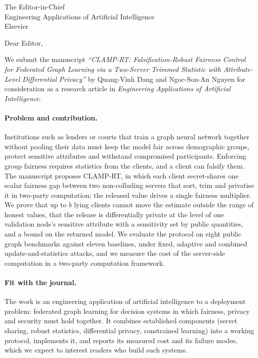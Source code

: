 \documentclass[11pt]{letter}
\date{\today}
\begin{document}
\begin{letter}{The Editor-in-Chief\\Engineering Applications of Artificial Intelligence\\Elsevier}

\opening{Dear Editor,}

We submit the manuscript \emph{``CLAMP-RT: Falsification-Robust Fairness Control for Federated Graph Learning via a Two-Server Trimmed Statistic with Attribute-Level Differential Privacy''} by Quang-Vinh Dang and Ngoc-Son-An Nguyen for consideration as a research article in \emph{Engineering Applications of Artificial Intelligence}.

\paragraph{Problem and contribution.} Institutions such as lenders or courts that train a graph neural network together without pooling their data must keep the model fair across demographic groups, protect sensitive attributes and withstand compromised participants. Enforcing group fairness requires statistics from the clients, and a client can falsify them. The manuscript proposes CLAMP-RT, in which each client secret-shares one scalar fairness gap between two non-colluding servers that sort, trim and privatise it in two-party computation; the released value drives a single fairness multiplier. We prove that up to $b$ lying clients cannot move the estimate outside the range of honest values, that the release is differentially private at the level of one validation node's sensitive attribute with a sensitivity set by public quantities, and a bound on the returned model. We evaluate the protocol on eight public graph benchmarks against eleven baselines, under fixed, adaptive and combined update-and-statistics attacks, and we measure the cost of the server-side computation in a two-party computation framework.

\paragraph{Fit with the journal.} The work is an engineering application of artificial intelligence to a deployment problem: federated graph learning for decision systems in which fairness, privacy and security must hold together. It combines established components (secret sharing, robust statistics, differential privacy, constrained learning) into a working protocol, implements it, and reports its measured cost and its failure modes, which we expect to interest readers who build such systems.


\end{letter}
\end{document}
